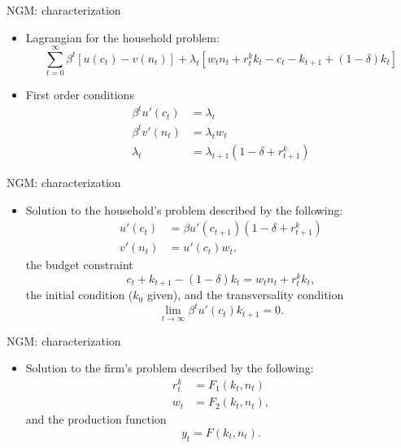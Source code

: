 \documentclass[11pt,xcolor={dvipsnames},aspectratio=159,hyperref={pdftex,pdfpagemode=UseNone,hidelinks,pdfdisplaydoctitle=true},usepdftitle=false]{beamer}
\begin{document}
    \begin{frame}{NGM: characterization}
    \begin{itemize}
    \item Lagrangian for the household problem: 
    \[
    \sum_{t=0}^{\infty}\beta^{t}\left[u\left(c_{t}\right)-v\left(n_{t}\right)\right]+\lambda_{t}\left[w_{t}n_{t}+r_{t}^{k}k_{t}-c_{t}-k_{t+1}+\left(1-\delta\right)k_{t}\right]
    \]
    \item First order conditions 
    \begin{align*}
    \beta^{t}u'\left(c_{t}\right) & =\lambda_{t}\\
    \beta^{t}v'\left(n_{t}\right) & =\lambda_{t}w_{t}\\
    \lambda_{t} & =\lambda_{t+1}\left(1-\delta+r_{t+1}^{k}\right)
    \end{align*}
    \end{itemize}
    \end{frame}


\begin{frame}{NGM: characterization}
    \begin{itemize}
    \item Solution to the household's problem described by the following: 
    \begin{align*}
        u'\left(c_{t}\right) & =\beta u'\left(c_{t+1}\right)\left(1-\delta+r_{t+1}^{k}\right)\\
        v'\left(n_{t}\right) & =u'\left(c_{t}\right)w_{t},
        \end{align*}
    the budget constraint $$c_{t}+k_{t+1}-\left(1-\delta\right)k_{t}=w_{t}n_{t}+r_{t}^{k}k_{t},$$ the initial condition ($k_0$ given), and the transversality condition $$\lim_{t\to\infty}\beta^{t}u'\left(c_{t}\right)k_{t+1}=0.$$   
    \end{itemize}
    \end{frame}    
    


\begin{frame}{NGM: characterization}
    \begin{itemize}
    \item Solution to the firm's problem described by the following: 
    \begin{align*}
        r_{t}^{k} & =F_{1}\left(k_{t},n_{t}\right)\\
        w_{t} & =F_{2}\left(k_{t},n_{t}\right),
        \end{align*}
    and the production function $$y_{t}=F\left(k_{t},n_{t}\right).$$
    \end{itemize}
    \end{frame}    
\end{document}
